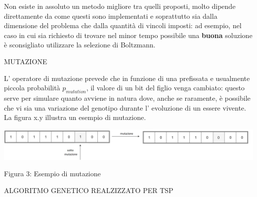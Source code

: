 \documentclass[11pt]{article}
\begin{document}
Non esiste in assoluto un metodo migliore tra quelli proposti, molto dipende direttamente da come questi sono implementati e soprattutto sia dalla dimensione del problema che dalla quantità di vincoli imposti: ad esempio, nel caso in cui sia richiesto di trovare nel minor tempo possibile una \textbf{buona} soluzione è sconsigliato utilizzare la selezione di Boltzmann.


\vspace{2\baselineskip}
MUTAZIONE
\vspace{2\baselineskip}

L' operatore di mutazione prevede che in funzione di una prefissata e usualmente piccola probabilità $p_{mutation}$, il valore di un bit del figlio venga cambiato: questo serve per simulare quanto avviene in natura dove, anche se raramente, è possibile che vi sia una variazione del genotipo durante l' evoluzione di un essere vivente.
La figura x.y illustra un esempio di mutazione.


\begin{center}
\includegraphics[scale=0.5]{Mutazione}

Figura 3: Esempio di mutazione
\end{center}


\vspace{2\baselineskip}
ALGORITMO GENETICO REALZIZZATO PER TSP
\vspace{2\baselineskip}
\end{document}
